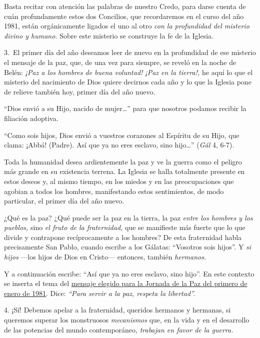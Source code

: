 Basta recitar con atención las palabras de nuestro Credo, para darse
cuenta de cuán profundamente estos dos Concilios, que recordaremos en el
curso del año 1981, están orgánicamente ligados el uno al otro \emph{con
	la profundidad del misterio divino y humano.} Sobre este misterio se
construye la fe de la Iglesia.

3.~El primer día del año deseamos leer de nuevo en la profundidad de ese
misterio el mensaje de la paz, que, de una vez para siempre, se reveló
en la noche de Belén: \emph{¡Paz a los hombres de buena voluntad! ¡Paz
	en la tierra!,} he aquí lo que el misterio del nacimiento de Dios quiere
decirnos cada año y lo que la Iglesia pone de relieve también hoy,
primer día del año nuevo.

``Dios envió a su Hijo, nacido de mujer\ldots{}'' para que nosotros
podamos recibir la filiación adoptiva.

``Como sois hijos, Dios envió a vuestros corazones al Espíritu de su
Hijo, que clama: ¡Abbá! (Padre). Así que ya no eres esclavo, sino
hijo\ldots{}'' (\emph{Gál} 4, 6-7).

Toda la humanidad desea ardientemente la paz y ve la guerra como el
peligro más grande en su existencia terrena. La Iglesia se halla
totalmente presente en estos deseos y, al mismo tiempo, en los miedos y
en las preocupaciones que agobian a todos los hombres, manifestando
estos sentimientos, de modo particular, el primer día del año nuevo.

¿Qué es la paz? ¿Qué puede ser la paz en la tierra, la paz \emph{entre
	los hombres y los pueblos,} sino \emph{el fruto de la fraternidad,} que
se manifieste más fuerte que lo que divide y contrapone recíprocamente a
los hombres? De esta fraternidad habla precisamente San Pablo, cuando
escribe a los Gálatas: ``Vosotros sois hijos''. Y \emph{si hijos} ---los
hijos de Dios en Cristo--- entonces, también \emph{hermanos.}

Y a continuación escribe: ``Así que ya no eres esclavo, sino hijo''. En
este contexto se inserta el tema del
\href{/content/john-paul-ii/es/messages/peace/documents/hf_jp-ii_mes_19801208_xiv-world-day-for-peace.html}{mensaje
	elegido para la Jornada de la Paz del primero de enero de 1981}. Dice:
\emph{``Para servir a la paz, respeta la libertad''.}

4. ¡Sí! Debemos apelar a la fraternidad, queridos hermanos y hermanas,
si queremos superar los monstruosos \emph{mecanismos} que, en la vida y
en el desarrollo de las potencias del mundo contemporáneo,
\emph{trabajan en favor de la guerra.}

